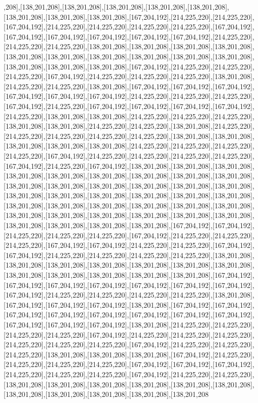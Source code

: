 ,208],[138,201,208],[138,201,208],[138,201,208],[138,201,208],[138,201,208],[138,201,208],[138,201,208],[138,201,208],[167,204,192],[214,225,220],[214,225,220],[167,204,192],[214,225,220],[214,225,220],[214,225,220],[214,225,220],[167,204,192],[167,204,192],[167,204,192],[167,204,192],[167,204,192],[167,204,192],[214,225,220],[214,225,220],[214,225,220],[138,201,208],[138,201,208],[138,201,208],[138,201,208],[138,201,208],[138,201,208],[138,201,208],[138,201,208],[138,201,208],[138,201,208],[138,201,208],[138,201,208],[138,201,208],[167,204,192],[214,225,220],[214,225,220],[214,225,220],[167,204,192],[214,225,220],[214,225,220],[214,225,220],[138,201,208],[214,225,220],[214,225,220],[138,201,208],[167,204,192],[167,204,192],[167,204,192],[167,204,192],[167,204,192],[167,204,192],[214,225,220],[214,225,220],[214,225,220],[167,204,192],[214,225,220],[167,204,192],[167,204,192],[167,204,192],[167,204,192],[214,225,220],[138,201,208],[138,201,208],[214,225,220],[214,225,220],[214,225,220],[138,201,208],[138,201,208],[214,225,220],[214,225,220],[138,201,208],[214,225,220],[214,225,220],[214,225,220],[214,225,220],[214,225,220],[138,201,208],[138,201,208],[138,201,208],[138,201,208],[138,201,208],[214,225,220],[214,225,220],[214,225,220],[214,225,220],[167,204,192],[214,225,220],[214,225,220],[214,225,220],[214,225,220],[167,204,192],[214,225,220],[167,204,192],[138,201,208],[138,201,208],[138,201,208],[138,201,208],[138,201,208],[138,201,208],[138,201,208],[138,201,208],[138,201,208],[138,201,208],[138,201,208],[138,201,208],[138,201,208],[138,201,208],[138,201,208],[138,201,208],[138,201,208],[138,201,208],[138,201,208],[138,201,208],[138,201,208],[138,201,208],[138,201,208],[138,201,208],[138,201,208],[138,201,208],[138,201,208],[138,201,208],[138,201,208],[138,201,208],[138,201,208],[138,201,208],[138,201,208],[138,201,208],[138,201,208],[138,201,208],[138,201,208],[167,204,192],[167,204,192],[214,225,220],[214,225,220],[214,225,220],[167,204,192],[214,225,220],[214,225,220],[214,225,220],[167,204,192],[167,204,192],[214,225,220],[214,225,220],[167,204,192],[167,204,192],[214,225,220],[214,225,220],[214,225,220],[214,225,220],[138,201,208],[138,201,208],[138,201,208],[138,201,208],[138,201,208],[138,201,208],[138,201,208],[138,201,208],[138,201,208],[138,201,208],[138,201,208],[138,201,208],[167,204,192],[167,204,192],[167,204,192],[167,204,192],[167,204,192],[167,204,192],[167,204,192],[167,204,192],[214,225,220],[214,225,220],[214,225,220],[214,225,220],[138,201,208],[167,204,192],[167,204,192],[167,204,192],[138,201,208],[167,204,192],[167,204,192],[167,204,192],[167,204,192],[167,204,192],[167,204,192],[167,204,192],[167,204,192],[167,204,192],[167,204,192],[167,204,192],[138,201,208],[214,225,220],[214,225,220],[214,225,220],[214,225,220],[167,204,192],[214,225,220],[214,225,220],[214,225,220],[214,225,220],[214,225,220],[214,225,220],[167,204,192],[214,225,220],[214,225,220],[214,225,220],[138,201,208],[138,201,208],[138,201,208],[167,204,192],[214,225,220],[214,225,220],[214,225,220],[214,225,220],[167,204,192],[167,204,192],[167,204,192],[214,225,220],[214,225,220],[214,225,220],[167,204,192],[214,225,220],[214,225,220],[138,201,208],[138,201,208],[138,201,208],[138,201,208],[138,201,208],[138,201,208],[138,201,208],[138,201,208],[138,201,208],[138,201,208],[138,201,208